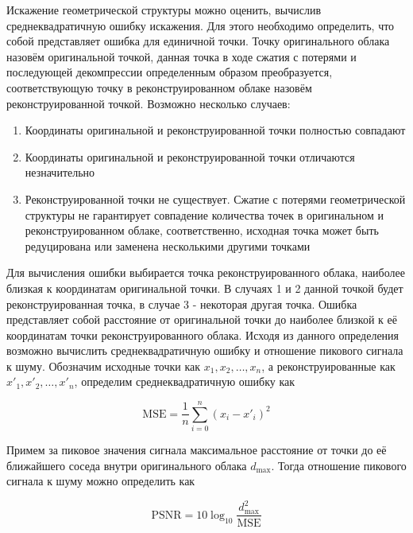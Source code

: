
Искажение геометрической структуры можно оценить, вычислив среднеквадратичную
ошибку искажения. Для этого необходимо определить, что собой представляет ошибка
для единичной точки. Точку оригинального облака назовём оригинальной точкой,
данная точка в ходе сжатия с потерями и последующей декомпрессии определенным
образом преобразуется, соответствующую точку в реконструированном облаке назовём
реконструированной точкой. Возможно несколько случаев:

\begin{enumerate}
    \item Координаты оригинальной и реконструированной точки полностью совпадают
    \item Координаты оригинальной и реконструированной точки отличаются
    незначительно
    \item Реконструированной точки не существует. Сжатие с потерями
    геометрической структуры не гарантирует совпадение количества точек в
    оригинальном и реконструированном облаке, соответственно, исходная точка
    может быть редуцирована или заменена несколькими другими точками
\end{enumerate}

Для вычисления ошибки выбирается точка реконструированного облака, наиболее
близкая к координатам оригинальной точки. В случаях 1 и 2 данной точкой будет
реконструированная точка, в случае 3 - некоторая другая точка. Ошибка
представляет собой расстояние от оригинальной точки до наиболее близкой к её
координатам точки реконструированного облака. Исходя из данного определения
возможно вычислить среднеквадратичную ошибку и отношение пикового сигнала к
шуму. Обозначим исходные точки как $x_{1}, x_{2}, \dots, x_{n}$, а
реконструированные как $x'_{1}, x'_{2}, \dots, x'_{n}$, определим
среднеквадратичную ошибку как

\begin{equation} \label{eq:cloud_mse}
    \text{MSE} = \frac{1}{n} \sum_{i = 0}^{n} \left( x_{i} - x'_{i} \right)^{2}
\end{equation}

Примем за пиковое значения сигнала максимальное расстояние от точки до её
ближайшего соседа внутри оригинального облака $d_{\max}$. Тогда отношение
пикового сигнала к шуму можно определить как

\begin{equation} \label{eq:cloud_psnr}
    \text{PSNR} = 10\log_{10} \frac{d_{\max}^{2}}{\text{MSE}}
\end{equation}

